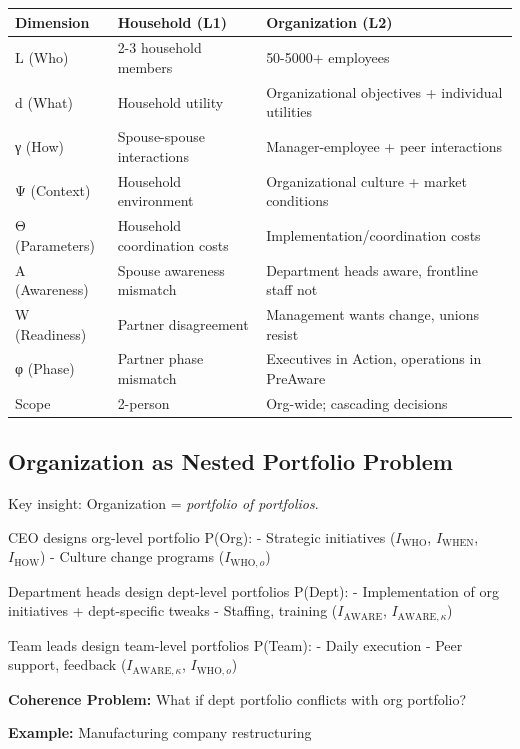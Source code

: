 \begin{center}
\begin{tabular}{@{}lll@{}}
\toprule
\textbf{Dimension} & \textbf{Household (L1)} & \textbf{Organization (L2)} \\
\midrule
L (Who) & 2-3 household members & 50-5000+ employees \\
d (What) & Household utility & Organizational objectives + individual utilities \\
γ (How) & Spouse-spouse interactions & Manager-employee + peer interactions \\
Ψ (Context) & Household environment & Organizational culture + market conditions \\
Θ (Parameters) & Household coordination costs & Implementation/coordination costs \\
A (Awareness) & Spouse awareness mismatch & Department heads aware, frontline staff not \\
W (Readiness) & Partner disagreement & Management wants change, unions resist \\
φ (Phase) & Partner phase mismatch & Executives in Action, operations in PreAware \\
Scope & 2-person & Org-wide; cascading decisions \\
\midrule
\end{tabular}
\end{center}

\subsection{Organization as Nested Portfolio Problem}

Key insight: Organization = \emph{portfolio of portfolios}.

CEO designs org-level portfolio P(Org):
- Strategic initiatives ($I_{\text{WHO}}$, $I_{\text{WHEN}}$, $I_{\text{HOW}}$)
- Culture change programs ($I_{\text{WHO},o}$)

Department heads design dept-level portfolios P(Dept):
- Implementation of org initiatives + dept-specific tweaks
- Staffing, training ($I_{\text{AWARE}}$, $I_{\text{AWARE},\kappa}$)

Team leads design team-level portfolios P(Team):
- Daily execution
- Peer support, feedback ($I_{\text{AWARE},\kappa}$, $I_{\text{WHO},o}$)

\textbf{Coherence Problem:} What if dept portfolio conflicts with org portfolio?

\textbf{Example:} Manufacturing company restructuring

